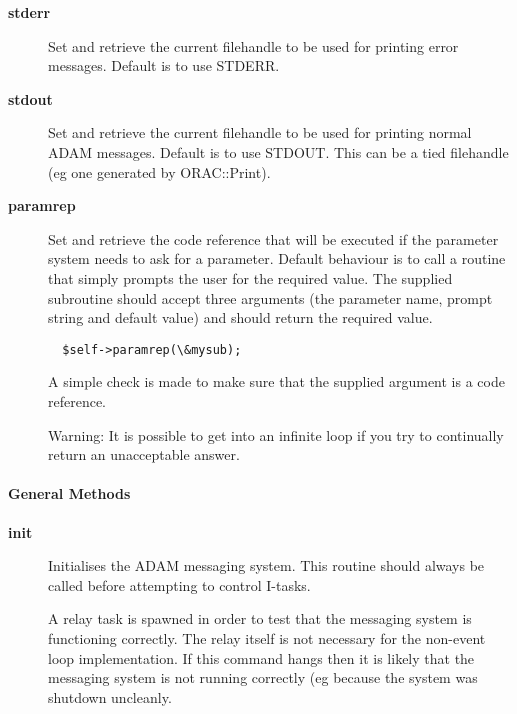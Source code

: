 \begin{description}
\begin{description}
\begin{description}
\item[{\textbf{stderr}}] \mbox{}

Set and retrieve the current filehandle to be used for printing
error messages. Default is to use STDERR.


\item[{\textbf{stdout}}] \mbox{}

Set and retrieve the current filehandle to be used for printing
normal ADAM messages. Default is to use STDOUT. This can be
a tied filehandle (eg one generated by ORAC::Print).


\item[{\textbf{paramrep}}] \mbox{}

Set and retrieve the code reference that will be executed if
the parameter system needs to ask for a parameter.
Default behaviour is to call a routine that simply prompts
the user for the required value. The supplied subroutine
should accept three arguments (the parameter name, prompt string and
default value) and should return the required value.

\begin{verbatim}
  $self->paramrep(\&mysub);
\end{verbatim}


A simple check is made to make sure that the supplied argument
is a code reference.



Warning: It is possible to get into an infinite loop if you try
to continually return an unacceptable answer.

\end{description}
\paragraph*{General Methods\label{ORAC::Msg::Control::AMS_General_Methods}}
\begin{description}

\item[{\textbf{init}}] \mbox{}

Initialises the ADAM messaging system. This routine should always be
called before attempting to control I-tasks.



A relay task is spawned in order to test that the messaging system
is functioning correctly. The relay itself is not necessary for the
non-event loop implementation. If this command hangs then it is
likely that the messaging system is not running correctly (eg
because the system was shutdown uncleanly.


\end{description}
\end{description}
\end{description}
